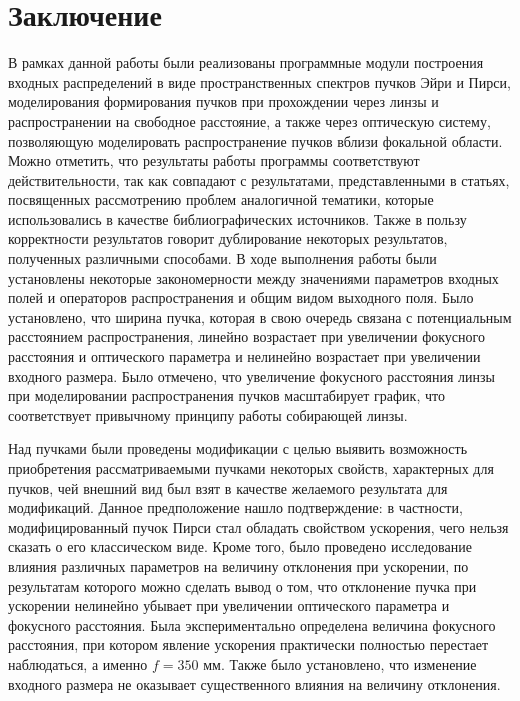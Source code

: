     \section*{Заключение}
    {

        \vspace{-0.2cm}
    В рамках данной работы были реализованы
    программные модули построения входных распределений в виде пространственных спектров пучков Эйри и Пирси, моделирования
    формирования пучков при прохождении через линзы и распространении на свободное расстояние, а также через оптическую систему,
    позволяющую моделировать распространение пучков вблизи фокальной области. Можно отметить, что
    результаты работы программы соответствуют действительности, так как
    совпадают с результатами, представленными в статьях, посвященных
    рассмотрению проблем аналогичной тематики, которые использовались в
    качестве библиографических источников. Также в пользу корректности результатов говорит дублирование некоторых результатов,
    полученных различными способами. В ходе выполнения работы были
    установлены некоторые закономерности между значениями параметров
    входных полей и операторов распространения и общим видом выходного поля. Было установлено, что ширина пучка,
    которая в свою очередь связана с потенциальным расстоянием распространения, линейно возрастает при увеличении
    фокусного расстояния и оптического параметра и нелинейно возрастает при увеличении входного размера.
    Было отмечено, что увеличение фокусного расстояния линзы при моделировании
    распространения пучков масштабирует график, что соответствует привычному принципу работы собирающей линзы.

    Над пучками были проведены модификации с целью выявить возможность приобретения рассматриваемыми
    пучками некоторых свойств, характерных для пучков, чей внешний вид был взят в качестве желаемого
    результата для модификаций. Данное предположение нашло подтверждение:
    в частности, модифицированный пучок Пирси стал обладать свойством ускорения,
    чего нельзя сказать о его классическом виде. Кроме того, было проведено исследование
    влияния различных параметров на величину отклонения при ускорении, по результатам которого можно сделать
    вывод о том, что отклонение пучка при ускорении нелинейно убывает при увеличении оптического параметра
    и фокусного расстояния. Была экспериментально определена величина фокусного расстояния, при котором явление
    ускорения практически полностью перестает наблюдаться, а именно $f = 350$ мм. Также было установлено, что
    изменение входного размера не оказывает существенного влияния на величину отклонения.

}
